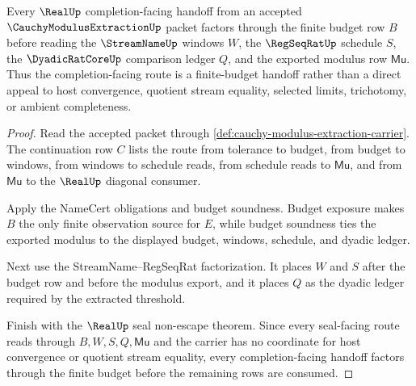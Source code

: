 \begin{theorem}
\label{thm:cauchy-modulus-extraction-budget-handoff}
Every $\RealUp$ completion-facing handoff from an accepted $\CauchyModulusExtractionUp$ packet factors through the finite budget row $B$ before reading the $\StreamNameUp$ windows $W$, the $\RegSeqRatUp$ schedule $S$, the $\DyadicRatCoreUp$ comparison ledger $Q$, and the exported modulus row $\mathsf{Mu}$. Thus the completion-facing route is a finite-budget handoff rather than a direct appeal to host convergence, quotient stream equality, selected limits, trichotomy, or ambient completeness.
\end{theorem}
\begin{proof}
Read the accepted packet through \autoref{def:cauchy-modulus-extraction-carrier}. The continuation row $C$ lists the route from tolerance to budget, from budget to windows, from windows to schedule reads, from schedule reads to $\mathsf{Mu}$, and from $\mathsf{Mu}$ to the $\RealUp$ diagonal consumer.

Apply the NameCert obligations and budget soundness. Budget exposure makes $B$ the only finite observation source for $E$, while budget soundness ties the exported modulus to the displayed budget, windows, schedule, and dyadic ledger.

Next use the StreamName--RegSeqRat factorization. It places $W$ and $S$ after the budget row and before the modulus export, and it places $Q$ as the dyadic ledger required by the extracted threshold.

Finish with the $\RealUp$ seal non-escape theorem. Since every seal-facing route reads through $B,W,S,Q,\mathsf{Mu}$ and the carrier has no coordinate for host convergence or quotient stream equality, every completion-facing handoff factors through the finite budget before the remaining rows are consumed.
\end{proof}

